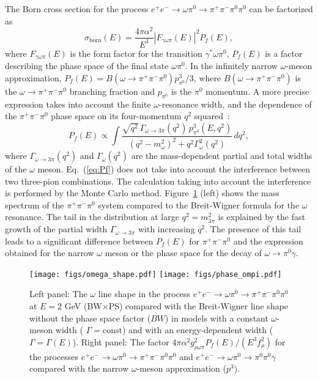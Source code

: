 \documentclass[twocolumn,aps,prd,floatfix,nofootinbib,superscriptaddress]{revtex4-2}
\begin{document}
The Born cross section for the process \( e^+e^- \to \omega\pi^0 \to \pi^+\pi^-\pi^0\pi^0 \) can be factorized as~\cite{kardopo13}
\begin{equation}
\label{eq:borncs}
	\sigma_\text{born}(E) = \frac{4\pi\alpha^2}{E^3}
	\left| F_{\gamma\omega\pi}(E) \right|^2 P_f(E),
\end{equation}
where $F_{\gamma\omega\pi}(E)$ is the form factor for the transition $\gamma^*\omega\pi^0$,
$P_f(E)$ is a factor describing the phase space of the final state $\omega\pi^0$.
In the infinitely narrow $\omega$-meson approximation, \( P_f(E) = B(\omega\to\pi^+\pi^-\pi^0)p_{\pi^0}^3/3 \), where $B(\omega\to\pi^+\pi^-\pi^0)$ is the \( \omega \to \pi^+\pi^-\pi^0 \) branching fraction and $p_{\pi^0}$ is the $\pi^0$ momentum.
A more precise expression takes into account the finite $\omega$-resonance width, and the dependence of the $\pi^+\pi^-\pi^0$ phase space on its four-momentum $q^2$ squared~\cite{theta2pi}:
\begin{equation}
	P_f(E) \propto \int \frac
		{ \sqrt{q^2}\, \Gamma_{\omega\to 3\pi}(q^2)\, p_{\pi^0}^3(E,q^2) }
		{ (q^2-m_\omega^2)^2 + q^2 \Gamma_\omega^2(q^2) }\, dq^2,
\label{eq:Pf}
\end{equation}
where $\Gamma_{\omega \to 3\pi}(q^2)$ and $\Gamma_\omega(q^2)$ are the mass-dependent partial and total widths of the $\omega$ meson.
Eq.~(\ref{eq:Pf}) does not take into account the interference between two three-pion combinations.
The calculation taking into account the interference is performed by the Monte Carlo method.
Figure~\ref{fig:omlnshape} (left) shows the mass spectrum of the $\pi^+\pi^-\pi^0$ system compared to the Breit-Wigner formula for the $\omega$ resonance.
The tail in the distribution at large \( q^2 = m_{3\pi}^2 \) is explained by the fast growth of the partial width $\Gamma_{\omega\to 3\pi}$ with increasing $q^2$.
The presence of this tail leads to a significant difference between $P_f(E)$ for $\pi^+\pi^-\pi^0$ and the expression obtained for the narrow $\omega$ meson or the phase space for the decay of $\omega \to \pi^0\gamma$.

\begin{figure}
\centering
\texttt{[image: figs/omega\_shape.pdf]}%
\texttt{[image: figs/phase\_ompi.pdf]}
\caption{
	Left panel: The $\omega$ line shape in the process \( e^+e^- \to \omega\pi^0 \to \pi^+\pi^-\pi^0\pi^0 \) at \( E = 2 \) GeV (BW$\times$PS) compared with the Breit-Wigner line shape without the phase space factor ($BW$) in models with a constant $\omega$-meson width ( $\Gamma =\mathrm{const}$) and with an energy-dependent width ($\Gamma =\Gamma(E)$).
	Right panel: The factor \( 4\pi\alpha^2 g_{\rho\omega\pi}^2 P_f(E) / (E^3 f_\rho^2) \) for the processes \( e^+e^- \to \omega\pi^0 \to \pi^+\pi^-\pi^0\pi^0 \) and \( e^+e^- \to \omega\pi^0 \to \pi^0\pi^0\gamma \) compared with the narrow $\omega$-meson approximation ($p^3$).
}
\label{fig:omlnshape}
\end{figure}
\end{document}
